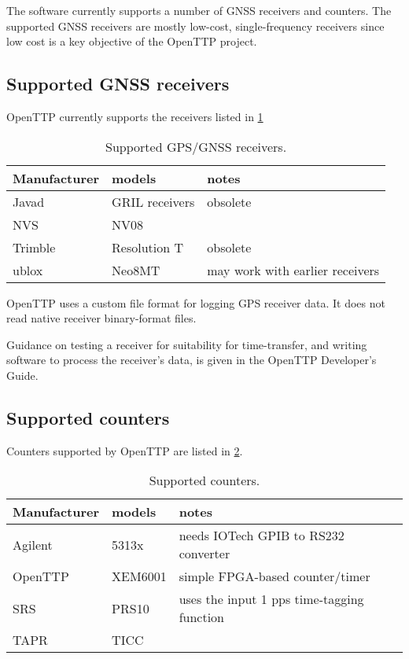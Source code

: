 The software currently supports a number of GNSS receivers and counters. 
The supported GNSS receivers are mostly low-cost, single-frequency receivers since low cost is a key objective of 
the OpenTTP project.
	
	\subsection{Supported GNSS receivers}
	
	OpenTTP currently supports the receivers listed in \ref{t:receivers}
	
	\begin{table}[h]
	\begin{tabular}{lll}
	Manufacturer & models & notes \\ \hline
	Javad & GRIL receivers & obsolete \\
	NVS   & NV08 & \\
	Trimble & Resolution T & obsolete\\
	ublox & Neo8MT & may work with earlier receivers\\
	\end{tabular}
	\caption{Supported GPS/GNSS receivers.\label{t:receivers}}
	\end{table}
	
	OpenTTP uses a custom file format for logging GPS receiver data. 
	It does not read native receiver binary-format files.
	
	Guidance on testing a receiver for suitability for time-transfer, and writing software to process
	the receiver's data, is given in the OpenTTP Developer's Guide.
	
	\subsection{Supported counters}
	
	Counters supported by OpenTTP are listed in \ref{t:counters}.
	
	\begin{table}[h]
	\begin{tabular}{lll}
	Manufacturer & models & notes \\ \hline
	Agilent & 5313x &  needs IOTech GPIB to RS232 converter\\
	OpenTTP & XEM6001 & simple FPGA-based counter/timer \\
	SRS & PRS10 & uses the input 1 pps time-tagging function\\
	TAPR & TICC &\\
	\end{tabular}
	\caption{Supported counters. \label{t:counters}}
	\end{table}
	
